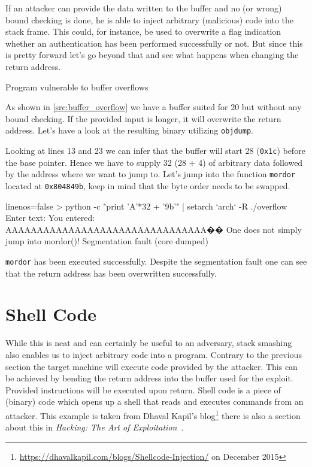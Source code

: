 \documentclass[article]{uibk}
\begin{document}
If an attacker can provide the data written to the buffer and no (or wrong)
bound checking is done, he is able to inject arbitrary (malicious) code into
the stack frame. This could, for instance, be used to overwrite a flag
indication whether an authentication has been performed successfully or not.
But since this is pretty forward let's go beyond that and see what happens when
changing the return address.

\begin{listing}[h!]
    \begin{minipage}[t]{0.37\textwidth}
    \end{minipage}\hfill
    \begin{minipage}[t]{0.63\textwidth}
    \end{minipage}
    \caption{Program vulnerable to buffer overflows}
    \label{src:buffer_overflow}
\end{listing}

As shown in \cref{src:buffer_overflow} we have a buffer suited for
\SI{20}{\byte} but without any bound checking. If the provided input is longer,
it will overwrite the return address. Let's have a look at the resulting binary
utilizing \texttt{objdump}.

Looking at lines 13 and 23 we can infer that the buffer will start
\SI{28}{\byte} (\texttt{0x1c}) before the base pointer. Hence we have to supply
\SI{32}{\byte} (28 + 4) of arbitrary data followed by the address where we want
to jump to. Let's jump into the function \texttt{mordor} located at
\texttt{0x804849b}, keep in mind that the byte order needs to be swapped.

\begin{code*}{linenos=false}
> python -c "print 'A'*32 + '\x9b'" | setarch `arch` -R ./overflow
Enter text:
You entered: AAAAAAAAAAAAAAAAAAAAAAAAAAAAAAAA��
One does not simply jump into mordor()!
Segmentation fault (core dumped)
\end{code*}

\texttt{mordor} has been executed successfully. Despite the segmentation fault
one can see that the return address has been overwritten successfully.

\section{Shell Code}

While this is neat and can certainly be useful to an adversary, stack smashing
also enables us to inject arbitrary code into a program. Contrary to the
previous section the target machine will execute code provided by the attacker.
This can be achieved by bending the return address into the buffer used for the
exploit. Provided instructions will be executed upon return. Shell code is a
piece of (binary) code which opens up a shell that reads and executes commands
from an attacker. This example is taken from Dhaval Kapil's
blog\footnote{\url{https://dhavalkapil.com/blogs/Shellcode-Injection/} on
December 2015} there is also a section about this in \textit{Hacking: The Art
of Exploitation}~\cite[pp.~281]{art_of_exploitation}.
\end{document}
